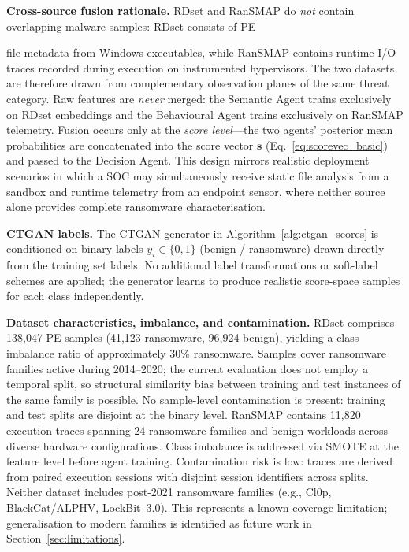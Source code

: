 \documentclass[3p]{elsarticle}
\begin{document}
\begin{changedblock}
\noindent\textbf{Cross-source fusion rationale.}
RDset and RanSMAP do \emph{not} contain overlapping malware samples: RDset consists of PE
\end{changedblock}
file metadata from Windows executables, while RanSMAP contains runtime I/O traces recorded
during execution on instrumented hypervisors. The two datasets are therefore drawn from
complementary observation planes of the same threat category. Raw features are
\emph{never} merged: the Semantic Agent trains exclusively on RDset embeddings and the
Behavioural Agent trains exclusively on RanSMAP telemetry. Fusion occurs only at the
\emph{score level}---the two agents' posterior mean probabilities are concatenated into the
score vector $\mathbf{s}$ (Eq.~\ref{eq:scorevec_basic}) and passed to the Decision Agent.
This design mirrors realistic deployment scenarios in which a SOC may simultaneously receive
static file analysis from a sandbox and runtime telemetry from an endpoint sensor, where
neither source alone provides complete ransomware characterisation.

\begin{changedblock}
\noindent\textbf{CTGAN labels.}
The CTGAN generator in Algorithm~\ref{alg:ctgan_scores} is conditioned on binary labels
$y_i \in \{0,1\}$ (benign / ransomware) drawn directly from the training set labels. No
additional label transformations or soft-label schemes are applied; the generator learns to
produce realistic score-space samples for each class independently.
\end{changedblock}

\begin{changedblock}
\noindent\textbf{Dataset characteristics, imbalance, and contamination.}
RDset comprises 138,047 PE samples (41,123 ransomware, 96,924 benign), yielding a class imbalance ratio of approximately 30\% ransomware. Samples cover ransomware families active during 2014--2020; the current evaluation does not employ a temporal split, so structural similarity bias between training and test instances of the same family is possible. No sample-level contamination is present: training and test splits are disjoint at the binary level. RanSMAP contains 11,820 execution traces spanning 24 ransomware families and benign workloads across diverse hardware configurations. Class imbalance is addressed via SMOTE at the feature level before agent training. Contamination risk is low: traces are derived from paired execution sessions with disjoint session identifiers across splits. Neither dataset includes post-2021 ransomware families (e.g., Cl0p, BlackCat/ALPHV, LockBit~3.0). This represents a known coverage limitation; generalisation to modern families is identified as future work in Section~\ref{sec:limitations}.
\end{changedblock}
\end{document}
